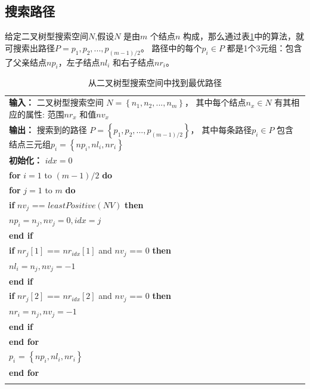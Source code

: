         \subsection{搜索路径}

        给定二叉树型搜索空间$N$,假设$N$ 是由$m$ 个结点$n$ 构成，那么通过表\ref{tab.c4_algori_bts}中的算法，就可搜索出路径$P={p_1,p_2,...,p_{(m-1)/2}}$。 路径中的每个$p_i \in P$ 都是1个3元组：包含了父亲结点$np_i$，左子结点$nl_i$ 和右子结点$nr_i$。

    \begin{table}[!h]
    \renewcommand\arraystretch{1.5}
    \centering
    \caption{从二叉树型搜索空间中找到最优路径}
    \begin{tabular}{p{}}
    \toprule
    \textbf{输入：} 二叉树型搜索空间 $N=\left\{n_1,n_2,...,n_m\right\}$， 其中每个结点$n_x \in N$ 有其相应的属性: 范围$nr_x$ 和值$nv_x$ \\
    \textbf{输出：} 搜索到的路径 $P=\left\{p_1,p_2,...,p_{(m-1)/2}\right\}$， 其中每条路径$p_{i} \in P$ 包含结点三元组$p_{i}=\left\{np_{i},nl_{i},nr_{i}\right\}$ \\
    \midrule
    \textbf{初始化：} $idx = 0$\\
    \textbf{for} $i=1$ to $(m-1)/2$ \textbf{do} \\
    \qquad \textbf{for} $j=1$ to $m$ \textbf{do} \\
    \qquad \qquad \textbf{if} $nv_j$ == $leastPositive(NV)$ \textbf{then} \\
    \qquad \qquad \qquad $np_i = n_j, nv_j = 0, idx = j$ \\
    \qquad \qquad \textbf{end if} \\
    \qquad \qquad \textbf{if} $nr_j[1]$ == $nr_{idx}[1]$ and $nv_j$ == $0$ \textbf{then} \\
    \qquad \qquad \qquad $nl_i = n_j, nv_j = -1$ \\
    \qquad \qquad \textbf{end if} \\
    \qquad \qquad \textbf{if} $nr_j[2]$ == $nr_{idx}[2]$ and $nv_j$ == $0$ \textbf{then} \\
    \qquad \qquad \qquad $nr_i = n_j, nv_j = -1$ \\
    \qquad \qquad \textbf{end if} \\
    \qquad \textbf{end for} \\
    \qquad $p_{i}$ = $\left\{ np_{i},nl_{i},nr_{i} \right\}$ \\
    \textbf{end for} \\
    \bottomrule
    \label{tab.c4_algori_bts}
    \end{tabular}
    \end{table}

